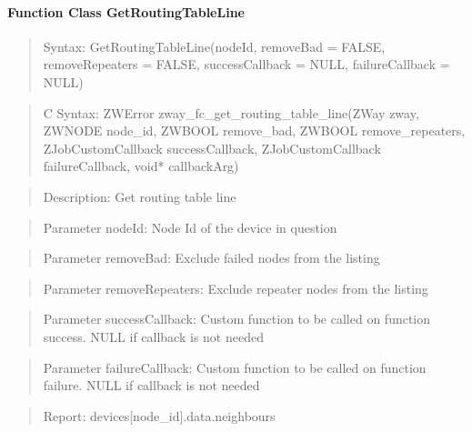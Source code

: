 \paragraph{Function Class GetRoutingTableLine}
\begin{quote}Syntax: GetRoutingTableLine(nodeId, removeBad = FALSE, removeRepeaters = FALSE, successCallback = NULL, failureCallback = NULL)\end{quote}
\begin{quote}C Syntax: ZWError zway\_fc\_get\_routing\_table\_line(ZWay zway, ZWNODE node\_id, ZWBOOL remove\_bad, ZWBOOL remove\_repeaters, ZJobCustomCallback successCallback, ZJobCustomCallback failureCallback, void* callbackArg)\end{quote}
\begin{quote}Description: Get routing table line\end{quote}
\begin{quote}Parameter nodeId: Node Id of the device in question\end{quote}
\begin{quote}Parameter removeBad: Exclude failed nodes from the listing\end{quote}
\begin{quote}Parameter removeRepeaters: Exclude repeater nodes from the listing\end{quote}
\begin{quote}Parameter successCallback: Custom function to be called on function success. NULL if callback is not needed\end{quote}
\begin{quote}Parameter failureCallback: Custom function to be called on function failure. NULL if callback is not needed\end{quote}
\begin{quote}Report: devices[node\_id].data.neighbours\end{quote}

